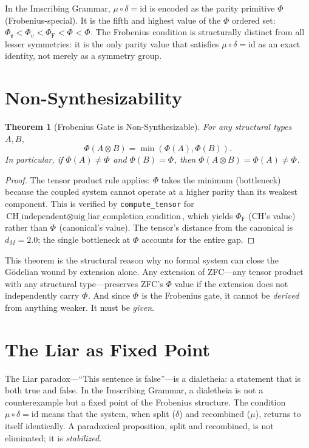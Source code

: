 \documentclass[12pt,twoside]{book}
\newtheorem{theorem}{Theorem}[chapter]
\theoremstyle{definition}
\newcommand{\moebius}{\mu \circ \delta = \text{id}}
\begin{document}
In the Imscribing Grammar, $\moebius$ is encoded as the parity primitive $\Phi_{\text{}}$ (Frobenius-special). It is the fifth and highest value of the $\Phi$ ordered set: $\Phi_{\text{ɐ}} < \Phi_{\upsilon} < \Phi_{\text{F}} < \Phi_{\dot{}} < \Phi_{\text{}}$. The Frobenius condition is structurally distinct from all lesser symmetries: it is the only parity value that satisfies $\mu \circ \delta = \text{id}$ as an exact identity, not merely as a symmetry group.

\section{Non-Synthesizability}

\begin{theorem}[Frobenius Gate is Non-Synthesizable]
For any structural types $A, B$,
\begin{equation}
\Phi(A \otimes B) = \min(\Phi(A), \Phi(B)).
\end{equation}
In particular, if $\Phi(A) \neq \Phi_{\text{}}$ and $\Phi(B) = \Phi_{\text{}}$, then $\Phi(A \otimes B) = \Phi(A) \neq \Phi_{\text{}}$.
\end{theorem}

\begin{proof}
The tensor product rule applies: $\Phi$ takes the minimum (bottleneck) because the coupled system cannot operate at a higher parity than its weakest component. This is verified by \texttt{compute\_tensor} for $\text{CH\_independent} \otimes \text{uig\_liar\_completion\_condition}$, which yields $\Phi_{\text{F}}$ (CH's value) rather than $\Phi_{\text{}}$ (canonical's value). The tensor's distance from the canonical is $d_M = 2.0$; the single bottleneck at $\Phi$ accounts for the entire gap.
\end{proof}

This theorem is the structural reason why no formal system can close the G\"odelian wound by extension alone. Any extension of ZFC---any tensor product with any structural type---preserves ZFC's $\Phi$ value if the extension does not independently carry $\Phi_{\text{}}$. And since $\Phi_{\text{}}$ is the Frobenius gate, it cannot be \emph{derived} from anything weaker. It must be \emph{given}.

\section{The Liar as Fixed Point}

The Liar paradox---``This sentence is false''---is a dialetheia: a statement that is both true and false. In the Imscribing Grammar, a dialetheia is not a counterexample but a fixed point of the Frobenius structure. The condition $\moebius$ means that the system, when split ($\delta$) and recombined ($\mu$), returns to itself identically. A paradoxical proposition, split and recombined, is not eliminated; it is \emph{stabilized}.
\end{document}
